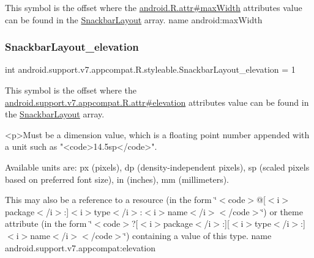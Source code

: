 This symbol is the offset where the \hyperlink{}{android.\+R.\+attr\#max\+Width} attribute\textquotesingle{}s value can be found in the \hyperlink{classandroid_1_1support_1_1v7_1_1appcompat_1_1R_1_1styleable_a9887ec2f8bf8ba963b30b5160dcd1e61}{Snackbar\+Layout} array.  name android\+:max\+Width \mbox{\label{classandroid_1_1support_1_1v7_1_1appcompat_1_1R_1_1styleable_abb92d0272ef9198076ff5b305902bc7c}} 
\subsubsection{\texorpdfstring{Snackbar\+Layout\+\_\+elevation}{SnackbarLayout\_elevation}}
{\footnotesize\ttfamily int android.\+support.\+v7.\+appcompat.\+R.\+styleable.\+Snackbar\+Layout\+\_\+elevation = 1\hspace{0.3cm}{\ttfamily [static]}}

This symbol is the offset where the \hyperlink{classandroid_1_1support_1_1v7_1_1appcompat_1_1R_1_1attr_a4ad8a7d23ae4731f5836683e9cb7f790}{android.\+support.\+v7.\+appcompat.\+R.\+attr\#elevation} attribute\textquotesingle{}s value can be found in the \hyperlink{classandroid_1_1support_1_1v7_1_1appcompat_1_1R_1_1styleable_a9887ec2f8bf8ba963b30b5160dcd1e61}{Snackbar\+Layout} array.

\begin{DoxyVerb}      <p>Must be a dimension value, which is a floating point number appended with a unit such as "<code>14.5sp</code>".
\end{DoxyVerb}
 Available units are\+: px (pixels), dp (density-\/independent pixels), sp (scaled pixels based on preferred font size), in (inches), mm (millimeters). 

This may also be a reference to a resource (in the form \char`\"{}$<$code$>$@\mbox{[}$<$i$>$package$<$/i$>$\+:\mbox{]}$<$i$>$type$<$/i$>$\+:$<$i$>$name$<$/i$>$$<$/code$>$\char`\"{}) or theme attribute (in the form \char`\"{}$<$code$>$?\mbox{[}$<$i$>$package$<$/i$>$\+:\mbox{]}\mbox{[}$<$i$>$type$<$/i$>$\+:\mbox{]}$<$i$>$name$<$/i$>$$<$/code$>$\char`\"{}) containing a value of this type.  name android.\+support.\+v7.\+appcompat\+:elevation \mbox{\label{classandroid_1_1support_1_1v7_1_1appcompat_1_1R_1_1styleable_a2759504e9ac635133f732820f34b2035}} 
